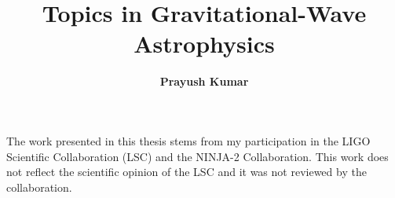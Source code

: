 \documentclass[12pt,notitlepage]{report}
\begin{document}
\title{
Topics in Gravitational-Wave Astrophysics
}
\author{\bf Prayush Kumar}
\havededicationtrue
\dedication{to\\ my parents and Bithika}
\haveminorfalse
\copyrighttrue
\doctoratetrue
\figurespagetrue
\tablespagetrue


\Abstract{
% 
% 
% 
% 
}
\beforepreface
{}
The work presented in this thesis stems from my participation in the
LIGO Scientific Collaboration (LSC) and the NINJA-2 Collaboration.  This
work does not reflect the scientific opinion of the LSC and it was not
reviewed by the collaboration.
\end{document}
